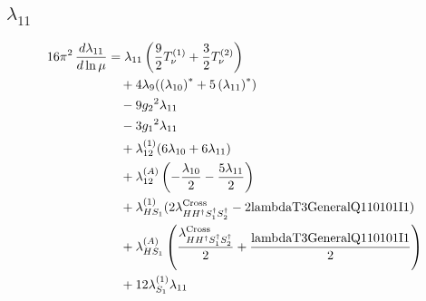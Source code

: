 \documentclass[10pt,a4paper]{article}
\begin{document}
\subsection*{$\lambda_{11}$}
\begin{align*}
16\pi^2\,\frac{d \lambda_{11}}{d\ln\mu} &={\lambda_{11}} \left(\frac{9}{2} T_{\nu}^{(1)}+\frac{3}{2} T_{\nu}^{(2)}\right) \\
&\quad +4 {\lambda_{9}} (\left({\lambda_{10}}\right)^{*}+5 \left({\lambda_{11}}\right)^{*}) \\
&\quad -9 {g_2}^2 {\lambda_{11}} \\
&\quad -3 {g_1}^2 {\lambda_{11}} \\
&\quad +{\lambda_{12}^{(1)}} (6 {\lambda_{10}}+6 {\lambda_{11}}) \\
&\quad +{\lambda_{12}^{(A)}} \left(-\frac{{\lambda_{10}}}{2}-\frac{5 {\lambda_{11}}}{2}\right) \\
&\quad +{\lambda_{HS_1}^{(1)}} (2 {\lambda_{H H^\dagger S_1^\dagger S_2^\dagger}^{\rm Cross}}-2 \text{lambdaT3GeneralQ110101I1}) \\
&\quad +{\lambda_{HS_1}^{(A)}} \left(\frac{{\lambda_{H H^\dagger S_1^\dagger S_2^\dagger}^{\rm Cross}}}{2}+\frac{\text{lambdaT3GeneralQ110101I1}}{2}\right) \\
&\quad +12 {\lambda_{S_1}^{(1)}} {\lambda_{11}} \\
\end{align*}
\end{document}
